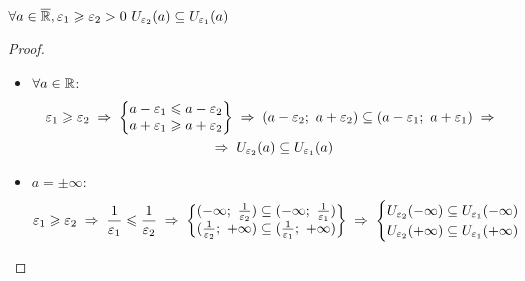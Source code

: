 \begin{lemma}
    $ \forall a \in \overline{\mathbb{R}}, \varepsilon_1 \geqslant \varepsilon_2 > 0\ U_{\varepsilon_2}(a) \subseteq U_{\varepsilon_1}(a)$
\end{lemma}
\begin{proof}\phantom\\
    \begin{itemize}
        \item $\forall a \in \mathbb{R}$:
        \begin{multline*}
            \varepsilon_1 \ge \varepsilon_2 \thus
            \begin{Bmatrix}
                a - \varepsilon_1 \le a - \varepsilon_2 \\
                a + \varepsilon_1 \ge a + \varepsilon_2
            \end{Bmatrix} \thus 
            (a - \varepsilon_2;\ a + \varepsilon_2) \subseteq (a - \varepsilon_1;\ a + \varepsilon_1) \thus \\
            \thus U_{\varepsilon_2}(a) \subseteq U_{\varepsilon_1}(a)
        \end{multline*}

        \item $a = \pm\infty$:
        \begin{multline*}
            \varepsilon_1 \ge \varepsilon_2 \thus
            \frac{1}{\varepsilon_1} \le \frac{1}{\varepsilon_2} \thus
            \begin{Bmatrix}
                (-\infty;\ \frac{1}{\varepsilon_2}) \subseteq (-\infty;\ \frac{1}{\varepsilon_1}) \\
                (\frac{1}{\varepsilon_2};\ +\infty) \subseteq (\frac{1}{\varepsilon_1};\ +\infty)
            \end{Bmatrix} \thus
            \begin{cases}
                U_{\varepsilon_2}(-\infty) \subseteq U_{\varepsilon_1}(-\infty) \\
                U_{\varepsilon_2}(+\infty) \subseteq U_{\varepsilon_1}(+\infty)
            \end{cases}
        \end{multline*}
    \end{itemize}
\end{proof}

